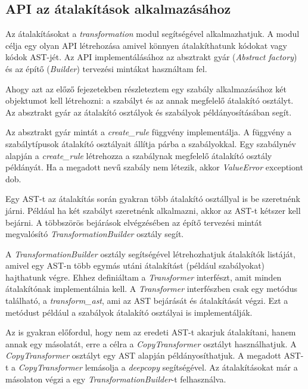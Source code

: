 \subsection{API az átalakítások alkalmazásához}

Az átalakításokat a \emph{transformation} modul segítségével alkalmazhatjuk.
A modul célja egy olyan API létrehozása amivel könnyen átalakíthatunk kódokat vagy kódok AST-jét.
Az API implementálásához az absztrakt gyár (\emph{Abstract factory}) és az építő (\emph{Builder})
tervezési mintákat használtam fel.

Ahogy azt az előző fejezetekben részleteztem
egy szabály alkalmazásához két objektumot kell létrehozni:
a szabályt és az annak megfelelő átalakító osztályt.
Az absztrakt gyár az átalakító osztályok és szabályok példányosításában segít.

Az absztrakt gyár mintát a \emph{create\_rule} függvény implementálja.
A függvény a szabálytípusok átalakító osztályait állítja párba a szabályokkal.
Egy szabálynév alapján a \emph{create\_rule} létrehozza
a szabálynak megfelelő átalakító osztály példányát.
Ha a megadott nevű szabály nem létezik, akkor \emph{ValueError} exceptiont dob.

Egy AST-t az átalakítás során gyakran több átalakító osztállyal is be szeretnénk járni.
Például ha két szabályt szeretnénk alkalmazni, akkor az AST-t kétszer kell bejárni.
A többszörös bejárások elvégzésében az építő tervezési mintát megvalósító
\emph{TransformationBuilder} osztály segít.

A \emph{TransformationBuilder} osztály segítségével
létrehozhatjuk átalakítók listáját, amivel egy AST-n több egymás utáni átalakítást
(például szabályokat) hajthatunk végre.
Ehhez definiáltam a \emph{Transformer} interfészt, amit minden átalakítónak
implementálnia kell.
A \emph{Transformer} interfészben csak egy metódus található, a \emph{transform\_ast},
ami az AST bejárását és átalakítását végzi.
Ezt a metódust például a szabályok átalakító osztályai is implementálják.

Az is gyakran előfordul, hogy nem az eredeti AST-t akarjuk átalakítani, hanem annak egy másolatát,
erre a célra a \emph{CopyTransformer} osztályt használhatjuk.
A \emph{CopyTransformer} osztályt egy AST alapján példányosíthatjuk.
A megadott AST-t a \emph{CopyTransformer} lemásolja a \emph{deepcopy} segítségével.
Az átalakításokat már a másolaton végzi a egy \emph{TransformationBuilder}-t felhasználva.

\pagebreak


